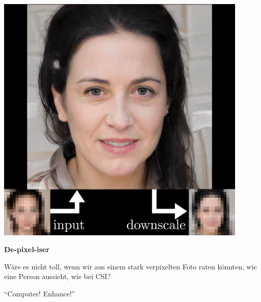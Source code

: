 \documentclass[aspectratio=169,usenames,dvipsnames]{beamer}
\begin{document}
\begin{frame}
\begin{minipage}{.5\textwidth}
\includegraphics[width=0.9\textwidth, keepaspectratio]{images/step3}
\end{minipage}\begin{minipage}{.5\textwidth}
\textbf{De-pixel-iser}
\bigskip

Wäre es nicht toll, wenn wir aus einem stark verpixelten Foto raten könnten, wie eine Person aussieht, wie bei CSI?
\bigskip

``Computer! Enhance!''
\end{minipage}
\end{frame}
\end{document}
